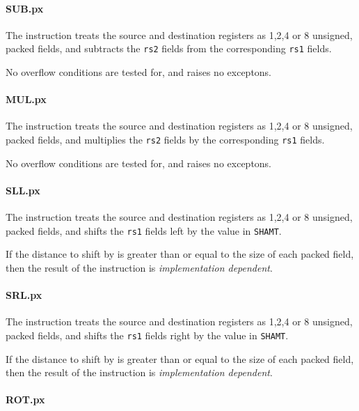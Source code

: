 \paragraph{SUB.px}

The instruction  treats the source and destination registers as
1,2,4 or 8 unsigned, packed fields, and subtracts the {\tt rs2} fields from
the corresponding {\tt rs1} fields.

No overflow conditions are tested for, and  raises no exceptons.

\paragraph{MUL.px}

The instruction  treats the source and destination registers as
1,2,4 or 8 unsigned, packed fields, and multiplies the {\tt rs2} fields by
the corresponding {\tt rs1} fields.

No overflow conditions are tested for, and  raises no exceptons.

\paragraph{SLL.px}

The instruction  treats the source and destination registers as
1,2,4 or 8 unsigned, packed fields, and shifts the {\tt rs1} fields left
by the value in {\tt SHAMT}.

If the distance to shift by is greater than or equal to the size of each
packed field, then the result of the  instruction is
{\em implementation dependent}.

\paragraph{SRL.px}

The instruction  treats the source and destination registers as
1,2,4 or 8 unsigned, packed fields, and shifts the {\tt rs1} fields right
by the value in {\tt SHAMT}.

If the distance to shift by is greater than or equal to the size of each
packed field, then the result of the  instruction is
{\em implementation dependent}.

\paragraph{ROT.px}

